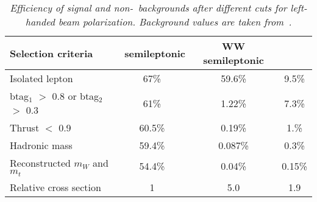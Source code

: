        \begin{table}[H]
        \begin{center}
        \begin{tabular}{l c c c}
        \hline
	Selection criteria & \ttbar\ semileptonic  & WW semileptonic &  \bbbar  \\
	\hline
	Isolated lepton 						& 67\% & 59.6\% & 9.5\% \\
	btag$_1$ $>$ 0.8 or btag$_2$ $>$ 0.3 	& 61\% & 1.22\% & 7.3\% \\
	Thrust $<$ 0.9 							& 60.5\% & 0.19\% & 1.\% \\
	Hadronic mass 							& 59.4\% & 0.087\% & 0.3\% \\
	Reconstructed $m_W$ and $m_t$ 			& 54.4\% & 0.04\% & 0.15\% \\
		\hline
	Relative cross section 					& 1 & 5.0 & 1.9 \\
        \hline
        \end{tabular}
        \end{center}
        \caption{\sl Efficiency of signal and non-\ttbar\ backgrounds after different cuts for left-handed beam polarization. Background values are taken from~\cite{bib:Jeremy}.}
        \label{table:ttbarselection}
        \end{table}
